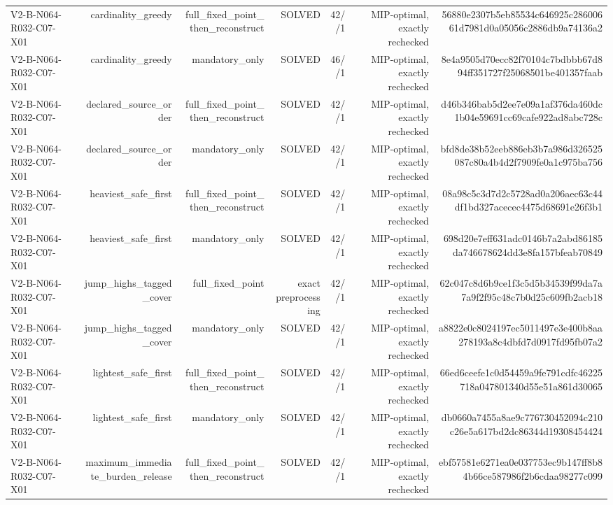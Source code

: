{\begin{longtable}{lrrrrrr}
V2-B-N064-R032-C07-X01 & cardinality\_greedy & full\_fixed\_point\_then\_reconstruct & SOLVED & 42//1 & MIP-optimal, exactly rechecked & 56880e2307b5eb85534c646925c28600661d7981d0a05056c2886db9a74136a2 \\
V2-B-N064-R032-C07-X01 & cardinality\_greedy & mandatory\_only & SOLVED & 46//1 & MIP-optimal, exactly rechecked & 8e4a9505d70ecc82f70104c7bdbbb67d894ff351727f25068501be401357faab \\
V2-B-N064-R032-C07-X01 & declared\_source\_order & full\_fixed\_point\_then\_reconstruct & SOLVED & 42//1 & MIP-optimal, exactly rechecked & d46b346bab5d2ee7e09a1af376da460dc1b04e59691cc69cafe922ad8abc728c \\
V2-B-N064-R032-C07-X01 & declared\_source\_order & mandatory\_only & SOLVED & 42//1 & MIP-optimal, exactly rechecked & bfd8de38b52eeb886eb3b7a986d326525087c80a4b4d2f7909fe0a1c975ba756 \\
V2-B-N064-R032-C07-X01 & heaviest\_safe\_first & full\_fixed\_point\_then\_reconstruct & SOLVED & 42//1 & MIP-optimal, exactly rechecked & 08a98c5c3d7d2c5728ad0a206aec63c44df1bd327acecec4475d68691e26f3b1 \\
V2-B-N064-R032-C07-X01 & heaviest\_safe\_first & mandatory\_only & SOLVED & 42//1 & MIP-optimal, exactly rechecked & 698d20e7eff631adc0146b7a2abd86185da746678624dd3e8fa157bfeab70849 \\
V2-B-N064-R032-C07-X01 & jump\_highs\_tagged\_cover & full\_fixed\_point & exact preprocessing & 42//1 & MIP-optimal, exactly rechecked & 62c047c8d6b9ce1f3c5d5b34539f99da7a7a9f2f95c48c7b0d25c609fb2acb18 \\
V2-B-N064-R032-C07-X01 & jump\_highs\_tagged\_cover & mandatory\_only & SOLVED & 42//1 & MIP-optimal, exactly rechecked & a8822e0c8024197ec5011497e3e400b8aa278193a8c4dbfd7d0917fd95fb07a2 \\
V2-B-N064-R032-C07-X01 & lightest\_safe\_first & full\_fixed\_point\_then\_reconstruct & SOLVED & 42//1 & MIP-optimal, exactly rechecked & 66ed6ceefe1c0d54459a9fe791cdfc46225718a047801340d55e51a861d30065 \\
V2-B-N064-R032-C07-X01 & lightest\_safe\_first & mandatory\_only & SOLVED & 42//1 & MIP-optimal, exactly rechecked & db0660a7455a8ae9c776730452094c210c26e5a617bd2dc86344d19308454424 \\
V2-B-N064-R032-C07-X01 & maximum\_immediate\_burden\_release & full\_fixed\_point\_then\_reconstruct & SOLVED & 42//1 & MIP-optimal, exactly rechecked & ebf57581e6271ea0e037753ec9b147ff8b84b66ce587986f2b6cdaa98277c099 \\

\end{longtable}}
